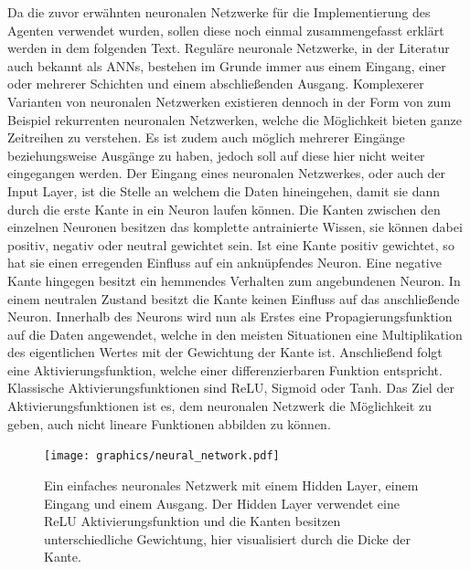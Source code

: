 \documentclass[]{iat}
\begin{document}
Da die zuvor erwähnten neuronalen Netzwerke für die Implementierung des Agenten verwendet wurden, sollen diese noch einmal zusammengefasst erklärt werden in dem folgenden Text. Reguläre neuronale Netzwerke, in der Literatur auch bekannt als ANNs, bestehen im Grunde immer aus einem Eingang, einer oder mehrerer Schichten und einem abschließenden Ausgang. Komplexerer Varianten von neuronalen Netzwerken existieren dennoch in der Form von zum Beispiel rekurrenten neuronalen Netzwerken, welche die Möglichkeit bieten ganze Zeitreihen zu verstehen. Es ist zudem auch möglich mehrerer Eingänge beziehungsweise Ausgänge zu haben, jedoch soll auf diese hier nicht weiter eingegangen werden. Der Eingang eines neuronalen Netzwerkes, oder auch der Input Layer, ist die Stelle an welchem die Daten hineingehen, damit sie dann durch die erste Kante in ein Neuron laufen können. Die Kanten zwischen den einzelnen Neuronen besitzen das komplette antrainierte Wissen, sie können dabei positiv, negativ oder neutral gewichtet sein. Ist eine Kante positiv gewichtet, so hat sie einen erregenden Einfluss auf ein anknüpfendes Neuron. Eine negative Kante hingegen besitzt ein hemmendes Verhalten zum angebundenen Neuron. In einem neutralen Zustand besitzt die Kante keinen Einfluss auf das anschließende Neuron. Innerhalb des Neurons wird nun als Erstes eine Propagierungsfunktion auf die Daten angewendet, welche in den meisten Situationen eine Multiplikation des eigentlichen Wertes mit der Gewichtung der Kante ist. Anschließend folgt eine Aktivierungsfunktion, welche einer differenzierbaren Funktion entspricht. Klassische Aktivierungsfunktionen sind ReLU, Sigmoid oder Tanh. Das Ziel der Aktivierungsfunktionen ist es, dem neuronalen Netzwerk die Möglichkeit zu geben, auch nicht lineare Funktionen abbilden zu können.
\begin{figure}[H]
    \texttt{[image: graphics/neural\_network.pdf]}
    \centering
    \caption{Ein einfaches neuronales Netzwerk mit einem Hidden Layer, einem Eingang und einem Ausgang. Der Hidden Layer verwendet eine ReLU Aktivierungsfunktion und die Kanten besitzen unterschiedliche Gewichtung, hier visualisiert durch die Dicke der Kante.}
    \label{abb:nn}
\end{figure}
\end{document}

